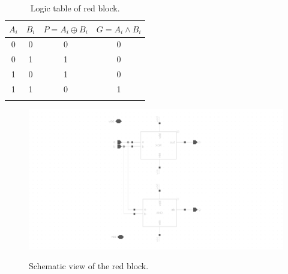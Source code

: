 \noindent {}

\begin{table}[H]
  \caption{Logic table of red block.}
  \centering
  \begin{tabular}{cc|cc}
    \toprule
    $A_i$ & $B_i$ & $P=A_i \oplus B_i$ & $G=A_i \wedge B_i$ \\
    \midrule
    0 & 0 & 0 & 0 \\
    0 & 1 & 1 & 0 \\
    1 & 0 & 1 & 0 \\
    1 & 1 & 0 & 1 \\
    \bottomrule
    \label{tab:red}
  \end{tabular}
\end{table}

\begin{figure}[H]
  \centering
  \captionsetup{justification=centering}
  {\includegraphics[width=2.0\textwidth]{../figures/red}}
  \caption{Schematic view of the red block.} \label{fig:red}
\end{figure}

